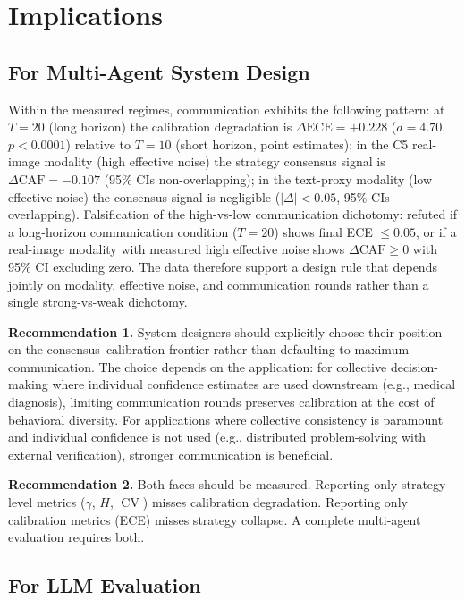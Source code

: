 \documentclass[11pt]{article}
\DeclareMathOperator{\CV}{CV}
\begin{document}
\section{Implications}

\subsection{For Multi-Agent System Design}

Within the measured regimes, communication exhibits the following pattern: at $T = 20$ (long horizon) the calibration degradation is $\Delta\text{ECE} = +0.228$ ($d = 4.70$, $p < 0.0001$) relative to $T = 10$ (short horizon, point estimates); in the C5 real-image modality (high effective noise) the strategy consensus signal is $\Delta\text{CAF} = -0.107$ (95\% CIs non-overlapping); in the text-proxy modality (low effective noise) the consensus signal is negligible ($|\Delta| < 0.05$, 95\% CIs overlapping). Falsification of the high-vs-low communication dichotomy: refuted if a long-horizon communication condition ($T = 20$) shows final ECE $\leq 0.05$, or if a real-image modality with measured high effective noise shows $\Delta\text{CAF} \geq 0$ with 95\% CI excluding zero. The data therefore support a design rule that depends jointly on modality, effective noise, and communication rounds rather than a single strong-vs-weak dichotomy.

\textbf{Recommendation 1.} System designers should explicitly choose their position on the consensus--calibration frontier rather than defaulting to maximum communication. The choice depends on the application: for collective decision-making where individual confidence estimates are used downstream (e.g., medical diagnosis), limiting communication rounds preserves calibration at the cost of behavioral diversity. For applications where collective consistency is paramount and individual confidence is not used (e.g., distributed problem-solving with external verification), stronger communication is beneficial.

\textbf{Recommendation 2.} Both faces should be measured. Reporting only strategy-level metrics ($\gamma$, $H$, $\CV$) misses calibration degradation. Reporting only calibration metrics (ECE) misses strategy collapse. A complete multi-agent evaluation requires both.

\subsection{For LLM Evaluation}
\end{document}
